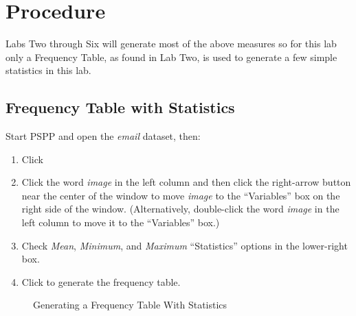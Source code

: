 \section{Procedure}

Labs Two through Six will generate most of the above measures so for this lab only a Frequency Table, as found in Lab Two, is used to generate a few simple statistics in this lab.

\subsection{Frequency Table with Statistics}

Start \acs{PSPP} and open the \textit{email} dataset, then:

\begin{enumerate}
  \item Click \textsc{}
  \item Click the word \textit{image} in the left column and then click the right-arrow button near the center of the window to move \textit{image} to the ``Variables'' box on the right side of the window. (Alternatively, double-click the word \textit{image} in the left column to move it to the ``Variables'' box.)
  \item Check \textit{Mean}, \textit{Minimum}, and \textit{Maximum} ``Statistics'' options in the lower-right box.
  \item Click  to generate the frequency table.
\end{enumerate}

\begin{figure}[H]
  \begin{center}
    \caption{Generating a Frequency Table With Statistics}
    \label{lab03_fig04}
  \end{center}
\end{figure}

